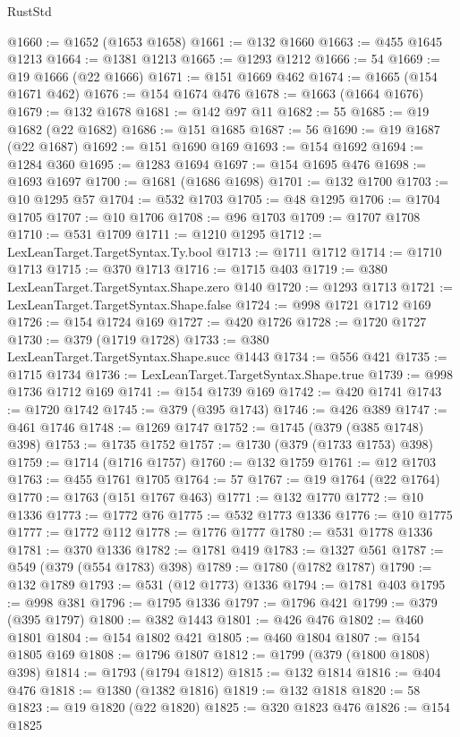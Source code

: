 \begin{lexlean}{RustStd}
\begin{coremodule}
@1660 := @1652 (@1653 @1658)
@1661 := @132 @1660
@1663 := @455 @1645 @1213
@1664 := @1381 @1213
@1665 := @1293 @1212
@1666 := 54
@1669 := @19 @1666 (@22 @1666)
@1671 := @151 @1669 @462
@1674 := @1665 (@154 @1671 @462)
@1676 := @154 @1674 @476
@1678 := @1663 (@1664 @1676)
@1679 := @132 @1678
@1681 := @142 @97 @11
@1682 := 55
@1685 := @19 @1682 (@22 @1682)
@1686 := @151 @1685
@1687 := 56
@1690 := @19 @1687 (@22 @1687)
@1692 := @151 @1690 @169
@1693 := @154 @1692
@1694 := @1284 @360
@1695 := @1283 @1694
@1697 := @154 @1695 @476
@1698 := @1693 @1697
@1700 := @1681 (@1686 @1698)
@1701 := @132 @1700
@1703 := @10 @1295 @57
@1704 := @532 @1703
@1705 := @48 @1295
@1706 := @1704 @1705
@1707 := @10 @1706
@1708 := @96 @1703
@1709 := @1707 @1708
@1710 := @531 @1709
@1711 := @1210 @1295
@1712 := LexLeanTarget.TargetSyntax.Ty.bool
@1713 := @1711 @1712
@1714 := @1710 @1713
@1715 := @370 @1713
@1716 := @1715 @403
@1719 := @380 LexLeanTarget.TargetSyntax.Shape.zero @140
@1720 := @1293 @1713
@1721 := LexLeanTarget.TargetSyntax.Shape.false
@1724 := @998 @1721 @1712 @169
@1726 := @154 @1724 @169
@1727 := @420 @1726
@1728 := @1720 @1727
@1730 := @379 (@1719 @1728)
@1733 := @380 LexLeanTarget.TargetSyntax.Shape.succ @1443
@1734 := @556 @421
@1735 := @1715 @1734
@1736 := LexLeanTarget.TargetSyntax.Shape.true
@1739 := @998 @1736 @1712 @169
@1741 := @154 @1739 @169
@1742 := @420 @1741
@1743 := @1720 @1742
@1745 := @379 (@395 @1743)
@1746 := @426 @389
@1747 := @461 @1746
@1748 := @1269 @1747
@1752 := @1745 (@379 (@385 @1748) @398)
@1753 := @1735 @1752
@1757 := @1730 (@379 (@1733 @1753) @398)
@1759 := @1714 (@1716 @1757)
@1760 := @132 @1759
@1761 := @12 @1703
@1763 := @455 @1761 @1705
@1764 := 57
@1767 := @19 @1764 (@22 @1764)
@1770 := @1763 (@151 @1767 @463)
@1771 := @132 @1770
@1772 := @10 @1336
@1773 := @1772 @76
@1775 := @532 @1773 @1336
@1776 := @10 @1775
@1777 := @1772 @112
@1778 := @1776 @1777
@1780 := @531 @1778 @1336
@1781 := @370 @1336
@1782 := @1781 @419
@1783 := @1327 @561
@1787 := @549 (@379 (@554 @1783) @398)
@1789 := @1780 (@1782 @1787)
@1790 := @132 @1789
@1793 := @531 (@12 @1773) @1336
@1794 := @1781 @403
@1795 := @998 @381
@1796 := @1795 @1336
@1797 := @1796 @421
@1799 := @379 (@395 @1797)
@1800 := @382 @1443
@1801 := @426 @476
@1802 := @460 @1801
@1804 := @154 @1802 @421
@1805 := @460 @1804
@1807 := @154 @1805 @169
@1808 := @1796 @1807
@1812 := @1799 (@379 (@1800 @1808) @398)
@1814 := @1793 (@1794 @1812)
@1815 := @132 @1814
@1816 := @404 @476
@1818 := @1380 (@1382 @1816)
@1819 := @132 @1818
@1820 := 58
@1823 := @19 @1820 (@22 @1820)
@1825 := @320 @1823 @476
@1826 := @154 @1825

\end{coremodule}
\end{lexlean}
